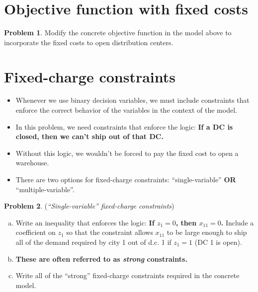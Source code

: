 \documentclass[11pt]{article}
\theoremstyle{definition}
\newtheorem{problem}{Problem}
\newcommand{\answerbox}[3]{%
  \fbox{%
    \begin{minipage}[#1]{#2}
      \hfill\vspace{#3}
    \end{minipage}
  }
}
\newcommand{\answerboxfull}[2]{%
  \answerbox{#1}{6.38in}{#2} 
}
\newcommand{\answerboxone}[2]{%
  \answerbox{#1}{6.0in}{#2} 
}
\begin{document}
\bigskip
\section{Objective function with fixed costs}
\begin{problem}
Modify the concrete objective function in the model above to incorporate the fixed costs to open distribution centers.
\end{problem}
\answerboxfull{c}{1.7in}

\newpage

\section{Fixed-charge constraints}

\begin{itemize}
\item Whenever we use binary decision variables, we must include constraints that enforce the correct behavior of the variables in the context of the model.  
\item In this problem, we need constraints that enforce the logic: \textbf{If a DC is closed, then we can't ship out of that DC.}
\item Without this logic, we wouldn't be forced to pay the fixed cost to open a warehouse.
\item There are two options for fixed-charge constraints:  ``single-variable''  \textbf{OR} ``multiple-variable''. 
\end{itemize}

\begin{problem}  (\emph{``Single-variable'' fixed-charge constraints}) 

\vspace{-.1in}
\begin{enumerate}[a.]
\item Write an inequality that enforces the logic:
\textbf{ If $z_1 = 0$, then $x_{11} = 0$.}  Include a coefficient on  $z_1$ so that the constraint allows $x_{11}$ to be large enough to ship all of the demand required by city 1 out of d.c. 1 if $z_1=1$ (DC 1 is open).

\answerboxone{c}{0.5 in}

\item[] \textbf{These are often referred to as \emph{strong} constraints.}
\item Write all of the ``strong'' fixed-charge constraints required in the concrete model.

\answerboxone{c}{1.5 in}
\end{enumerate}
\end{problem}
\end{document}
